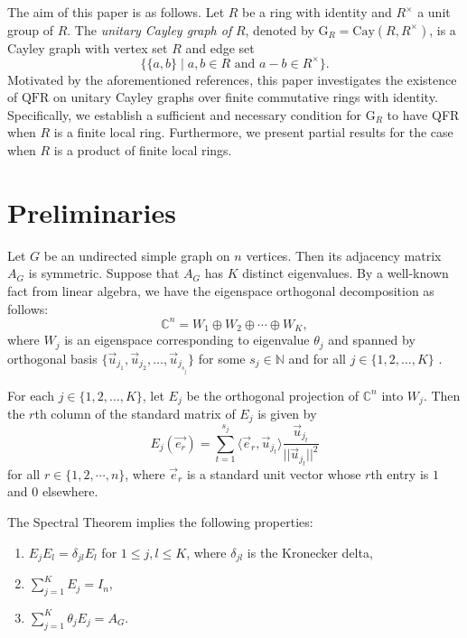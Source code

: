 \documentclass[12pt]{amsart}
\numberwithin{equation}{section}
\theoremstyle{definition}
\theoremstyle{definition} \numberwithin{equation}{section}
\newcommand{\G}{\mathrm{G}}
\newcommand{\Cay}{\mathrm{Cay}}
\newcommand{\QFR}{\mathrm{QFR}}
\begin{document}
\smallskip 
The aim of this paper is as follows. Let $R$ be a ring with identity and $R^\times$ a unit group of $R$. The \textit{unitary Cayley graph of} $R$, denoted by $\G_R = \Cay (R,R^\times )$, is a Cayley graph with vertex set $R$ and edge set 
$$
\{\{a,b\} \mid a,b \in R  \text{ and }  a - b \in R^{\times} \}.
$$
Motivated by the aforementioned references, this paper investigates the existence of $\QFR$ on unitary Cayley graphs over finite commutative rings with identity. Specifically, we establish a sufficient and necessary condition for $\G_R$ to have QFR when $R$ is a finite local ring. Furthermore, we present partial results for the case when $R$ is a product of finite local rings. 

\section{Preliminaries}

Let $G$ be an undirected simple graph on $n$ vertices. Then its adjacency matrix $A_G$ is symmetric. Suppose that $A_G$ has $K$ distinct eigenvalues. By a well-known fact from linear algebra, we have the eigenspace orthogonal decomposition as follows:
\[
\mathbb{C}^n=W_1 \oplus W_2 \oplus \cdots \oplus W_K,
\]
 where $W_j$ is an eigenspace corresponding to eigenvalue $\theta_j$ and spanned by orthogonal basis $\{ \Vec{u}_{j_1}, \Vec{u}_{j_2}, \ldots , \Vec{u}_{j_{s_j}} \} $ for some $s_j \in \mathbb{N}$ and for all $j \in \{ 1, 2,\ldots, K \}$ \cite[Theorem 6.3]{FSH}.
 
 For each $j \in \{ 1,2,\ldots,K \}$, let $E_j$ be the orthogonal projection of $\mathbb{C}^n$ into $W_j$. Then the $r$th column of the standard matrix of $E_j$ is given by
     \begin{equation} \label{Ej formula}
         E_j(\Vec{e_r}) =  \sum_{t = 1}^{s_j} \langle \Vec{e}_r,\Vec{u}_{j_t} \rangle \frac{\Vec{u}_{j_t}}{||\Vec{u}_{j_t}||^2}
     \end{equation}
     for all $r \in \{1,2,\cdots ,n\}$, where $\vec{e}_r$ is a standard unit vector whose $r$th entry is $1$ and $0$ elsewhere. 
     
     The Spectral Theorem \cite[Theorem 6.25]{FSH} implies the following properties:
 \begin{enumerate}
      [label=(\roman*)]
     \item  $E_j E_l = \delta_{jl}E_l$ for $1\le j,l \le K$, where $\delta_{jl}$ is the Kronecker delta,
     \item  $\sum_{j = 1}^K E_j = I_n$,
     \item  $\sum_{j = 1}^K \theta_j E_j = A_G$.
     \end{enumerate}
 
\end{document}
